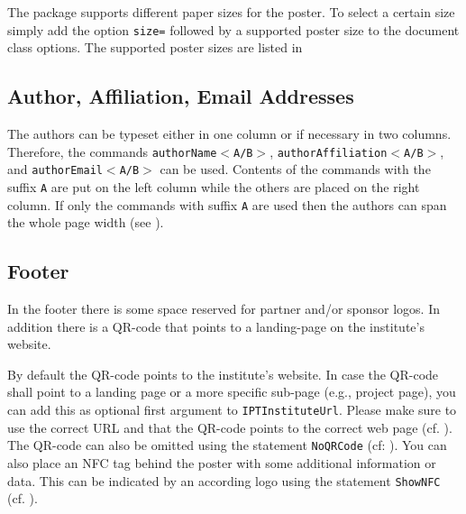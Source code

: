 The \tugPoster{} package supports different paper sizes for the poster. To select a certain size simply add the option \texttt{size=} followed by a supported poster size to the document class options. The supported poster sizes are listed in 



\subsection{Author, Affiliation, Email Addresses}

The authors can be typeset either in one column or if necessary in two columns. Therefore, the commands \texttt{\bs{}authorName$<$A/B$>$}, \texttt{\bs{}authorAffiliation$<$A/B$>$}, and \texttt{\bs{}authorEmail$<$A/B$>$} can be used. Contents of the commands with the suffix \texttt{A} are put on the left column while the others are placed on the right column. If only the commands with suffix \texttt{A} are used then the authors can span the whole page width (see ).



\subsection{Footer} %
\label{subsed:footer}

In the footer there is some space reserved for partner and/or sponsor logos. In addition there is a QR-code that points to a landing-page on the institute's website.

By default the QR-code points to the institute's website. In case the QR-code shall point to a landing page or a more specific sub-page (e.g., project page), you can add this as optional first argument to \texttt{\bs{}IPTInstituteUrl}.  Please make sure to use the correct URL and that the QR-code points to the correct web page (cf. ).
The QR-code can also be omitted using the statement \texttt{\bs{}NoQRCode} (cf: ). You can also place an NFC tag behind the poster with some additional information or data. This can be indicated by an according logo using the statement \texttt{\bs{}ShowNFC} (cf. ).


